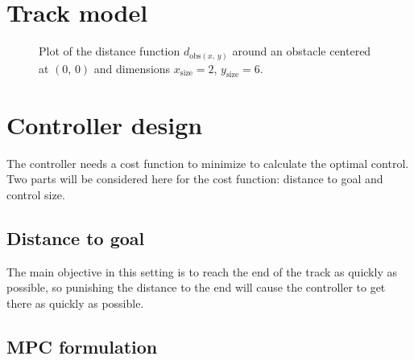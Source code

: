 \documentclass{article}
\begin{document}
\section{Track model}

\begin{figure}[!ht]
  \centering
  \caption{Plot of the distance function $d_{\mathrm{obs}(x,\,y)}$ around an obstacle centered at $(0,\,0)$ and dimensions $x_{\mathrm{size}}=2$, $y_{\mathrm{size}}=6$.}
  \label{fig:obsdistfunc}
\end{figure}

\section{Controller design}
The controller needs a cost function to minimize to calculate the optimal control. Two parts will be considered here for the cost function: distance to goal and control size.

\subsection{Distance to goal}
The main objective in this setting is to reach the end of the track as quickly as possible, so punishing the distance to the end will cause the controller to get there as quickly as possible.

\subsection{MPC formulation}
\end{document}
